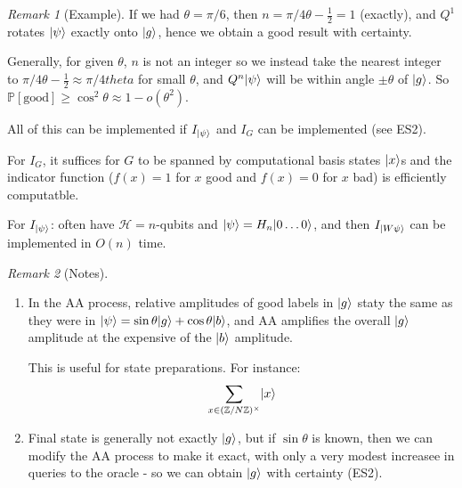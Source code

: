 \documentclass[]{article}
\DeclarePairedDelimiter\ket{\lvert}{\rangle}
\theoremstyle{custhm}
\theoremstyle{cusdef}
\theoremstyle{custhm}
\theoremstyle{custhm}
\theoremstyle{custhm}
\theoremstyle{custhm}
\theoremstyle{cusdef}
\theoremstyle{remark}
\newtheorem*{remark*}{Remark}
\newcommand{\Z}{\mathbb{Z}}
\renewcommand{\P}{\mathbb{P}}
\begin{document}
\begin{remark*}[Example]
If we had $\theta = \pi/6$, then $n = \pi/4\theta - \frac{1}{2} = 1$ (exactly), and $Q^1$ rotates $\ket{\psi}$ exactly onto $\ket{g}$, hence we obtain a good result with certainty.
\end{remark*}

Generally, for given $\theta$, $n$ is not an integer so we instead take the nearest integer to $\pi/4\theta - \frac{1}{2} \approx \pi/4theta$ for small $\theta$, and $Q^n\ket{\psi}$ will be within angle $\pm \theta$ of $\ket{g}$. So $\P[\textrm{good}]\ge \cos^2\theta \approx 1 - o(\theta^2)$.

All of this can be implemented if $I_{\ket{\psi}}$ and $I_{G}$ can be implemented (see ES2).

For $I_G$, it suffices for $G$ to be spanned by computational basis states $\ket{x}$s and the indicator function ($f(x) = 1$ for $x$ good and $f(x) = 0$ for $x$ bad) is efficiently computatble.

For $I_{\ket{\psi}}$: often have $\mathcal{H} = n$-qubits and $\ket{\psi} = H_n\ket{0\dots 0}$, and then $I_{\ket{W\psi}}$ can be implemented in $O(n)$ time.

\begin{remark*}[Notes]\ 
	\begin{enumerate}
		\item In the AA process, relative amplitudes of good labels in $\ket{g}$ staty the same as they were in $\ket{\psi} = \sin\theta\ket{g} + \cos\theta \ket{b}$, and AA amplifies the overall $\ket{g}$ amplitude at the expensive of the $\ket{b}$ amplitude.
	
		This is useful for state preparations. For instance:
		\begin{align*}
			\sum_{x\in (\Z/N\Z)^\times}\ket{x}
		\end{align*}

		\item Final state is generally not exactly $\ket{g}$, but if $\sin\theta$ is known, then we can modify the AA process to make it exact, with only a very modest increasee in queries to the oracle - so we can obtain $\ket{g}$ with certainty (ES2).
	\end{enumerate}
\end{remark*}
\end{document}
